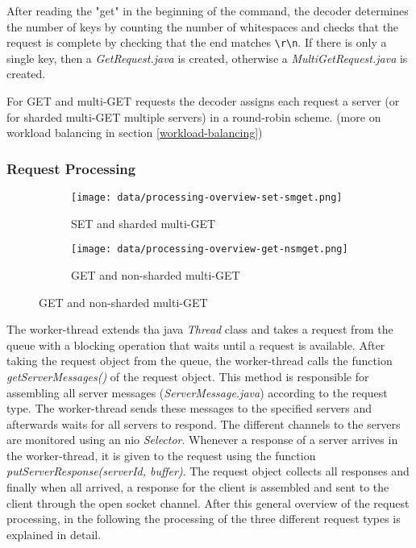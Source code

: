 \documentclass[report.tex]{subfiles}
\begin{document}
After reading the "get" in the beginning of the command, the decoder determines the number of keys by counting the number of whitespaces and checks that the request is complete by checking that the end matches \texttt{\textbackslash r\textbackslash n}. If there is only a single key, then a \emph{GetRequest.java} is created, otherwise a \emph{MultiGetRequest.java} is created.

For GET and multi-GET requests the decoder assigns each request a server (or for sharded multi-GET multiple servers) in a round-robin scheme. (more on workload balancing in section \ref{workload-balancing})


\subsubsection{Request Processing}\label{request-processing}

\begin{figure}[H]
	\begin{subfigure}[b]{.25\linewidth}
		\centering
		\texttt{[image: data/processing-overview-set-smget.png]}
		\caption{SET and sharded multi-GET}\label{processing-set-smget}
	\end{subfigure}\hfill
	\begin{subfigure}[b]{.25\linewidth}
		\centering
		\texttt{[image: data/processing-overview-get-nsmget.png]}
		\caption{GET and non-sharded multi-GET}\label{processing-get-nsmget}
	\end{subfigure}%
\end{figure}


The worker-thread extends tha java \emph{Thread} class and takes a request from the queue with a blocking operation that waits until a request is available.
After taking the request object from the queue, the worker-thread calls the function \emph{getServerMessages()} of the request object.
This method is responsible for assembling all server messages (\emph{ServerMessage.java}) according to the request type.
The worker-thread sends these messages to the specified servers and afterwards waits for all servers to respond.
The different channels to the servers are monitored using an nio \emph{Selector}. Whenever a response of a server arrives in the worker-thread, it is given to the request using the function \emph{putServerResponse(serverId, buffer)}. The request object collects all responses and finally when all arrived, a response for the client is assembled and sent to the client through the open socket channel. After this general overview of the request processing, in the following the processing of the three different request types is explained in detail.
\end{document}
